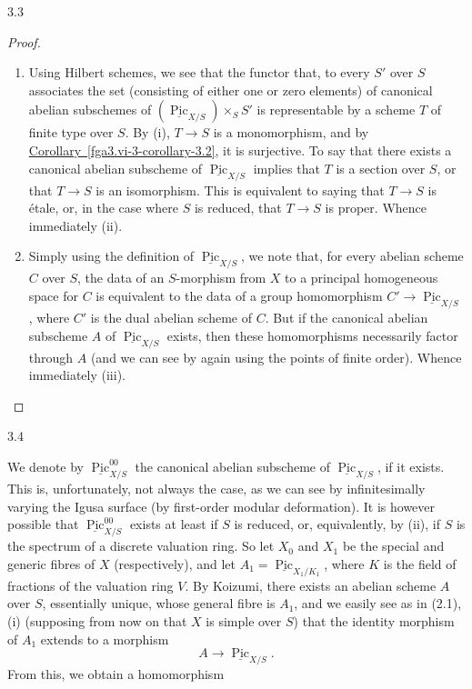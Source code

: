 \begin{theorem}{3.3}
\begin{proof}
\begin{enumerate}
        (This result generalises a classical theorem of Chow).

      \item{}Using Hilbert schemes, we see that the functor that, to every \(S'\) over \(S\) associates the set (consisting of either one or zero elements) of canonical abelian subschemes of \((\underline {\operatorname {Pic}}_{X/S})\times _S S'\) is representable by a scheme \(T\) of finite type over \(S\).
        By (i), \(T\to  S\) is a monomorphism, and by \hyperref[fga3.vi-3-corollary-3.2]{Corollary~\ref*{fga3.vi-3-corollary-3.2}}, it is surjective.
        To say that there exists a canonical abelian subscheme of \(\underline {\operatorname {Pic}}_{X/S}\) implies that \(T\) is a section over \(S\), or that \(T\to  S\) is an isomorphism.
        This is equivalent to saying that \(T\to  S\) is étale, or, in the case where \(S\) is reduced, that \(T\to  S\) is proper.
        Whence immediately (ii).

      \item{}Simply using the definition of \(\underline {\operatorname {Pic}}_{X/S}\), we note that, for every abelian scheme \(C\) over \(S\), the data of an \(S\)-morphism from \(X\) to a principal homogeneous space for \(C\) is equivalent to the data of a group homomorphism \(C'\to \underline {\operatorname {Pic}}_{X/S}\), where \(C'\) is the dual abelian scheme of \(C\).
        But if the canonical abelian subscheme \(A\) of \(\underline {\operatorname {Pic}}_{X/S}\) exists, then these homomorphisms necessarily factor through \(A\) (and we can see by again using the points of finite order).
        Whence immediately (iii).\qedhere\end{enumerate}\end{proof}\end{theorem}\begin{remark}{3.4}\label{fga3.vi-3-remarks-3.4}\skipsinglepar\par{}We denote by \(\underline {\operatorname {Pic}}_{X/S}^{00}\) the canonical abelian subscheme of \(\underline {\operatorname {Pic}}_{X/S}\), if it exists.
    This is, unfortunately, not always the case, as we can see by infinitesimally varying the Igusa surface (by first-order modular deformation).
    It is however possible that \(\underline {\operatorname {Pic}}_{X/S}^{00}\) exists at least if \(S\) is reduced, or, equivalently, by (ii), if \(S\) is the spectrum of a discrete valuation ring.
    So let \(X_0\) and \(X_1\) be the special and generic fibres of \(X\) (respectively), and let \(A_1=\underline {\operatorname {Pic}}_{X_1/K_1}\), where \(K\) is the field of fractions of the valuation ring \(V\).
    By Koizumi, there exists an abelian scheme \(A\) over \(S\), essentially unique, whose general fibre is \(A_1\), and we easily see as in (2.1), (i) (supposing from now on that \(X\) is simple over \(S\)) that the identity morphism of \(A_1\) extends to a morphism
    \[       A \to  \underline {\operatorname {Pic}}_{X/S}.     \]
    From this, we obtain a homomorphism


\end{remark}
